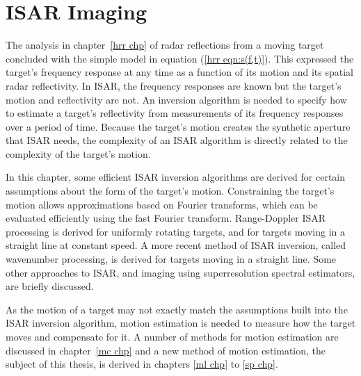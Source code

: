 %
%
%
%
%
%
%

\chapter{ISAR Imaging}
\label{ii chp}

\bigletter The analysis in chapter~\ref{hrr chp} of radar reflections from a
moving target concluded with the simple model in equation 
(\ref{hrr eqn:s(f,t)}).  This expressed the target's frequency response at
any time as a function of its motion and its spatial radar reflectivity.  In
ISAR, the frequency responses are known but the target's motion and
reflectivity are not.  An inversion algorithm is needed to specify how to
estimate a target's reflectivity from measurements of its frequency
responses over a period of time.  Because the target's motion creates the
synthetic aperture that ISAR needs, the complexity of an ISAR algorithm is
directly related to the complexity of the target's motion.  

In this chapter, some efficient ISAR inversion algorithms are derived for
certain assumptions about the form of the target's motion.  Constraining the
target's motion allows approximations based on Fourier transforms, which can
be evaluated efficiently using the fast Fourier transform. Range-Doppler
ISAR processing is derived for uniformly rotating targets, and for targets
moving in a straight line at constant speed.  A more recent method of ISAR
inversion, called wavenumber processing, is derived for targets moving in a
straight line.  Some other approaches to ISAR, and imaging using 
superresolution spectral estimators, are briefly discussed.

As the motion of a target may not exactly match the assumptions built into
the ISAR inversion algorithm, motion estimation is needed to measure how the
target moves and compensate for it.  A number of methods for motion
estimation are discussed in chapter~\ref{mc chp} and a new method of motion
estimation, the subject of this thesis, is derived in chapters \ref{ml chp}
to \ref{sp chp}.  

